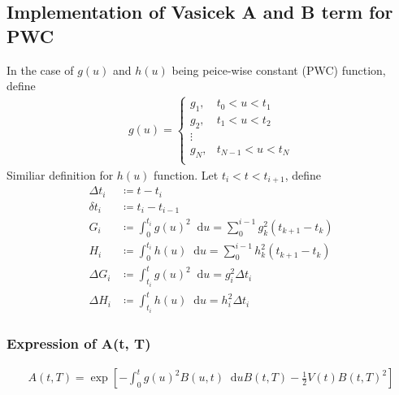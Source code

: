 \documentclass[12pt]{article}
\newcommand{\dd}{\mathop{}\!\text{d}}
\newcommand{\half}{\frac{1}{2}}
\begin{document}
\begin{appendices}
\subsection{Implementation of Vasicek A and B term for PWC}
In the case of $g(u)$ and $h(u)$ being peice-wise constant (PWC) function,
define
\begin{align}
    g(u) =
    \begin{cases}
        g_1, & t_0 < u < t_1 \\
        g_2, & t_1 < u < t_2 \\
        \vdots & \\
        g_N, & t_{N-1} < u < t_N \\
    \end{cases}
\end{align}
Similiar definition for $h(u)$ function.
Let $t_i < t < t_{i+1}$, define
\begin{align}
    \Delta t_i &\coloneqq t - t_i \\
    \delta t_i &\coloneqq t_i - t_{i-1} \\
    G_i &\coloneqq \int_0^{t_i} g(u)^2 \dd u = \sum_0^{i-1} g_k^2 (t_{k+1} - t_k) \\
    H_i &\coloneqq \int_0^{t_i} h(u) \dd u = \sum_0^{i-1} h_k^2 (t_{k+1} - t_k) \\
    \Delta G_i &\coloneqq \int_{t_i}^t g(u)^2 \dd u = g_i^2 \Delta t_i \\
    \Delta H_i &\coloneqq \int_{t_i}^t h(u) \dd u = h_i^2 \Delta t_i
\end{align}

\subsubsection{Expression of A(t, T)}
\begin{align}
    \label{Aeq:A}
    A(t, T) = \exp \left[
        - \int_0^t g(u)^2 B(u, t) \dd u B(t, T) - \half V(t) B(t, T)^2
    \right]
\end{align}


\end{appendices}
\end{document}
